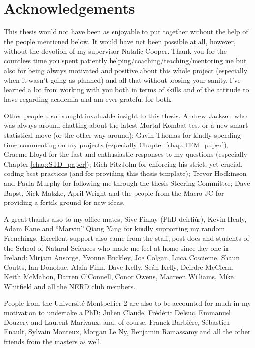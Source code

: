 \chapter*{Acknowledgements}

This thesis would not have been as enjoyable to put together without the help of the people mentioned below.
It would have not been possible at all, however, without the devotion of my supervisor Natalie Cooper.
Thank you for the countless time you spent patiently helping/coaching/teaching/mentoring me but also for being always motivated and positive about this whole project (especially when it wasn't going as planned) and all that without loosing your sanity.
I've learned a lot from working with you both in terms of skills and of the attitude to have regarding academia and am ever grateful for both.

Other people also brought invaluable insight to this thesis:
Andrew Jackson who was always around chatting about the latest Mortal Kombat test or a new smart statistical move (or the other way around);
Gavin Thomas for kindly spending time commenting on my projects (especially Chapter \ref{chap:TEM_paper});
Graeme Lloyd for the fast and enthusiastic responses to my questions (especially Chapter \ref{chap:STD_paper});
Rich FitzJohn for enforcing his strict, yet crucial, coding best practices (and for providing this thesis template);
Trevor Hodkinson and Paula Murphy for following me through the thesis Steering Committee;
Dave Bapst, Nick Matzke, April Wright and the people from the Macro JC for providing a fertile ground for new ideas.

A great thanks also to my office mates, Sive Finlay (PhD deirfi\'{u}r), Kevin Healy, Adam Kane and ``Marvin'' Qiang Yang for kindly supporting my random Frenchings.
Excellent support also came from the staff, post-docs and students of the School of Natural Sciences who made me feel at home since day one in Ireland:
Mirjam Ansorge, Yvonne Buckley, Joe Colgan, Luca Coscieme, Shaun Coutts, Ian Donohue, Alain Finn, Dave Kelly, Se\'{a}n Kelly, Deirdre McClean, Keith McMahon, Darren O'Connell, Conor Owens, Maureen Williams, Mike Whitfield and all the NERD club members.

People from the Universit\'{e} Montpellier 2 are also to be accounted for much in my motivation to undertake a PhD: %
Julien Claude, Fr\'{e}d\'{e}ric Delsuc, Emmanuel Douzery and Laurent Marivaux;
and, of course, Franck Barbi\`{e}re, S\'{e}bastien Enault, Sylvain Monteux, Morgan Le Ny, Benjamin Ramassamy and all the other friends from the masters as well.

